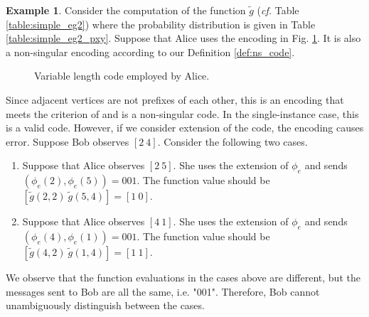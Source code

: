 \documentclass[journal, onecolumn, draftcls]{IEEEtran}
\theoremstyle{definition}
\newtheorem{example}{Example}
\newcommand{\meng}[1]{\marginpar{+}{\bf Ruoyu's remark}: {\em #1}}
\newcommand{\aditya}[1]{\marginpar{+}{\bf Aditya's remark}: {\em #1}}
\begin{document}
\begin{example}\label{example:C5_VLC}
Consider the computation of the function $\tilde g$ ({\it cf.} Table \ref{table:simple_eg2}) where the probability distribution is given in Table \ref{table:simple_eg2_pxy}. Suppose that Alice uses the encoding in Fig. \ref{fig:c5_vlc_encoding}. %
It is also a non-singular encoding according to our Definition \ref{def:ns_code}.
\begin{figure}[h]
    \centering

    \caption{Variable length code employed by Alice.}
    \label{fig:c5_vlc_encoding}
\end{figure}
Since adjacent vertices are not prefixes of each other, this is an encoding that meets the criterion of \cite{AlonO_96} and is a non-singular code. 
In the single-instance case, this is a valid code. However, if we consider extension of the code, the encoding causes error. Suppose Bob observes $[2 ~ 4]$. Consider the following two cases. %
\begin{enumerate}
    \item Suppose that Alice observes $[2~ 5]$. She uses the extension of $\phi_e$ and sends $(\phi_e(2),\phi_e(5) ) = 001$. The function value should be $[\tilde g(2,2)~\tilde g(5,4)]=[1~0]$. %
    \item Suppose that Alice observes $[4~ 1]$. She uses the extension of $\phi_e$ and sends $(\phi_e(4),\phi_e(1) ) = 001$. The function value should be $[\tilde g(4,2)~\tilde g(1,4)]=[1~1]$. %
\end{enumerate}
We observe that the function evaluations in the cases above are different, but the messages sent to Bob are all the same, i.e. "001". Therefore, Bob cannot unambiguously distinguish between the cases.%
\end{example}
\end{document}
